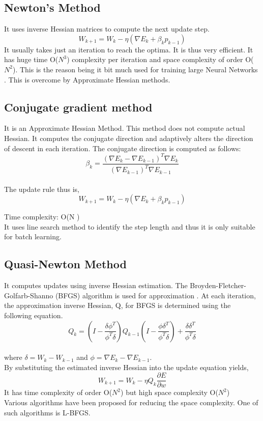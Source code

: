 \documentclass[journal]{IEEEtran}
\begin{document}
\subsection{Newton's Method}
It uses inverse Hessian matrices to compute the next update step.
$$ W_{k+1}=W_{k}-\eta\left(\nabla E_{k}+\beta_{k} p_{k-1}\right) $$
It usually takes just an iteration to reach the optima. It is thus very efficient. It has huge time O($N^3$) complexity per iteration and space complexity of order O($N^2$).
This is the reason being it bit much used for training large Neural Networks \cite{williams1989style}.  
This is overcome by Approximate Hessian methods.

\subsection{Conjugate gradient method}
It is an Approximate Hessian Method. This method does not compute actual Hessian. It computes the conjugate direction and adaptively alters the direction of descent in each iteration. The conjugate direction is computed as follows: 
$$ \beta_{k}=\frac{\left(\nabla E_{k}-\nabla E_{k-1}\right)^{T} \nabla E_{k}}{\left(\nabla E_{k-1}\right)^{T} \nabla E_{k-1}} $$ \\
The update rule thus is, \\
$$ W_{k+1}=W_{k}-\eta\left(\nabla E_{k}+\beta_{k} p_{k-1}\right) $$ 

Time complexity: O(N ) \\
It uses line search method to identify the step length and thus it is only suitable for batch learning.

\subsection{Quasi-Newton Method}
It computes updates using inverse Hessian estimation. The Broyden-Fletcher-Golfarb-Shanno (BFGS) algorithm is used for approximation \cite{loke1996rapid}. At each iteration, the approximation inverse Hessian, Q, for BFGS is determined using the following equation.  \\

$$ Q_{k}=\left(I-\frac{\delta \phi^{T}}{\phi^{T} \delta}\right) Q_{k-1}\left(I-\frac{\phi \delta^{T}}{\phi^{T} \delta}\right)+\frac{\delta \delta^{T}}{\phi^{T} \delta} $$ \\

where $ \delta=W_{k}-W_{k-1} $ and $ \phi=\nabla E_{k}-\nabla E_{k-1} $. \\
By substituting the estimated inverse Hessian into the update equation yields,
$$ W_{k+1}=W_{k}-\eta Q_{k} \frac{\partial E}{\partial w} $$ 
It has time complexity of order O($N^2$) but high space complexity O($N^2$) \\
Various algorithms have been proposed for reducing the space complexity. One of such algorithms is L-BFGS.
\end{document}
